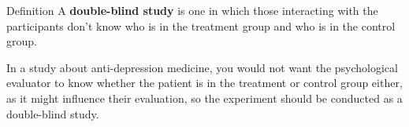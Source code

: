 \documentclass{beamer}
\begin{document}
\begin{frame}
\begin{block}{Definition}
A \textbf{double-blind study} is one in which those interacting with the participants don't know who is in the treatment group and who is in the control group. 
\end{block}\pause

\begin{example}
In a study about anti-depression medicine, you would not want the psychological evaluator to know whether the patient is in the treatment or control group either, as it might influence their evaluation, so the experiment should be conducted as a double-blind study.
\end{example}
\end{frame}
\end{document}
